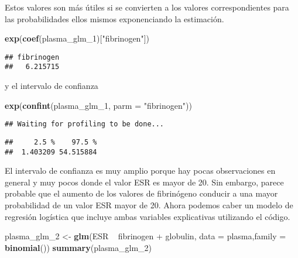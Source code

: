 \documentclass[]{article}
\newenvironment{Shaded}{\begin{snugshade}}{\end{snugshade}}
\newcommand{\KeywordTok}[1]{\textcolor[rgb]{0.13,0.29,0.53}{\textbf{{#1}}}}
\newcommand{\DataTypeTok}[1]{\textcolor[rgb]{0.13,0.29,0.53}{{#1}}}
\newcommand{\StringTok}[1]{\textcolor[rgb]{0.31,0.60,0.02}{{#1}}}
\newcommand{\NormalTok}[1]{{#1}}
\numberwithin{equation}{section}
\begin{document}
Estos valores son más útiles si se convierten a los valores
correspondientes para las probabilidades ellos mismos exponenciando la
estimación.

\begin{Shaded}
\begin{Highlighting}[]
\KeywordTok{exp}\NormalTok{(}\KeywordTok{coef}\NormalTok{(plasma_glm_1)[}\StringTok{"fibrinogen"}\NormalTok{])}
\end{Highlighting}
\end{Shaded}

\begin{verbatim}
## fibrinogen 
##   6.215715
\end{verbatim}

y el intervalo de confianza

\begin{Shaded}
\begin{Highlighting}[]
\KeywordTok{exp}\NormalTok{(}\KeywordTok{confint}\NormalTok{(plasma_glm_1, }\DataTypeTok{parm =} \StringTok{"fibrinogen"}\NormalTok{))}
\end{Highlighting}
\end{Shaded}

\begin{verbatim}
## Waiting for profiling to be done...
\end{verbatim}

\begin{verbatim}
##     2.5 %    97.5 % 
##  1.403209 54.515884
\end{verbatim}

El intervalo de confianza es muy amplio porque hay pocas observaciones
en general y muy pocos donde el valor ESR es mayor de 20. Sin embargo,
parece probable que el aumento de los valores de fibrinógeno conducir a
una mayor probabilidad de un valor ESR mayor de 20. Ahora podemos caber
un modelo de regresión logística que incluye ambas variables
explicativas utilizando el código.

\begin{Shaded}
\begin{Highlighting}[]
\NormalTok{plasma_glm_2 <-}\StringTok{ }\KeywordTok{glm}\NormalTok{(ESR ~}\StringTok{ }\NormalTok{fibrinogen +}\StringTok{ }\NormalTok{globulin, }\DataTypeTok{data =} \NormalTok{plasma,}\DataTypeTok{family =} \KeywordTok{binomial}\NormalTok{())}
\KeywordTok{summary}\NormalTok{(plasma_glm_2)}
\end{Highlighting}
\end{Shaded}
\end{document}
